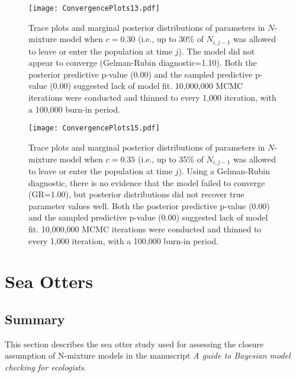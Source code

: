 \documentclass[12pt,letterpaper,final]{article}\usepackage[]{graphicx}\usepackage[]{color}
\begin{document}
\begin{center}
  \begin{figure}[H]
    \texttt{[image: ConvergencePlots13.pdf]}
    \caption[Simulated data: $c=0.30$]{Trace plots and marginal
      posterior distributions of parameters in $N$-mixture model when
      $c=0.30$ (i.e., up to 30\% of $N_{i,j-1}$ was allowed to leave
      or enter the population at time $j$). The model did not appear
      to converge (Gelman-Rubin diagnostic=1.10). Both the posterior
      predictive p-value (0.00) and the sampled predictive p-value
      (0.00) suggested lack of model fit. 10,000,000 MCMC iterations
      were conducted and thinned to every 1,000 iteration, with a
      100,000 burn-in period.}
  \end{figure}
\end{center}

\begin{center}
  \begin{figure}[H]
    \texttt{[image: ConvergencePlots15.pdf]}
    \caption[Simulated data: $c=0.35$]{Trace plots and marginal
      posterior distributions of parameters in $N$-mixture model when
      $c=0.35$ (i.e., up to 35\% of $N_{i,j-1}$ was allowed to leave
      or enter the population at time $j$). Using a Gelman-Rubin
      diagnostic, there is no evidence that the model failed to
      converge (GR=1.00), but posterior distributions did not recover
      true parameter values well. Both the posterior predictive
      p-value (0.00) and the sampled predictive p-value (0.00)
      suggested lack of model fit. 10,000,000 MCMC iterations were
      conducted and thinned to every 1,000 iteration, with a 100,000
      burn-in period.}
  \end{figure}
\end{center}



\newpage
\section{Sea Otters}

\subsection{Summary}
This section describes the sea otter study used for assessing the
closure assumption of N-mixture models in the manuscript \emph{A guide
  to Bayesian model checking for ecologists}.
\end{document}

